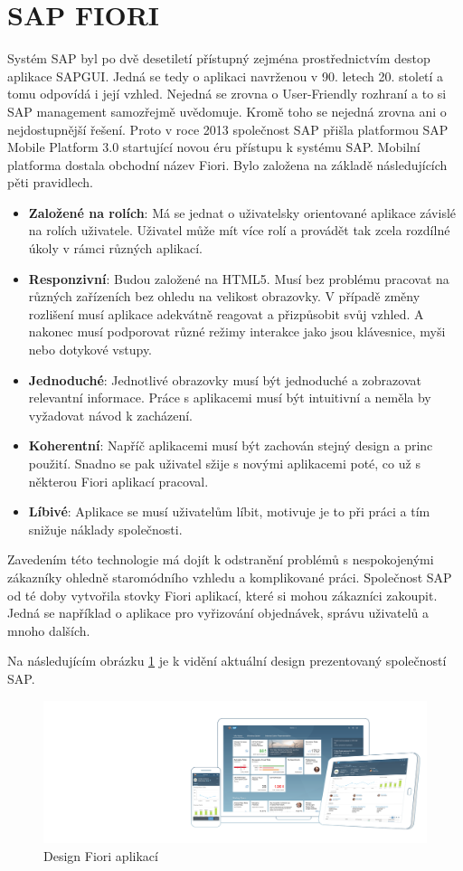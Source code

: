 \documentclass[thesis=M,czech]{FITthesis}[2012/06/26]
\begin{document}
\section{SAP FIORI}
\label{sec:fiori}
Systém SAP byl po dvě desetiletí přístupný zejména prostřednictvím destop aplikace SAPGUI. Jedná se tedy o aplikaci navrženou v 90. letech 20. století a tomu odpovídá i její vzhled. Nejedná se zrovna o User-Friendly rozhraní a to si SAP management samozřejmě uvědomuje. Kromě toho se nejedná zrovna ani o nejdostupnější řešení. Proto v roce 2013 společnost SAP přišla platformou SAP Mobile Platform 3.0 startující novou éru přístupu k systému SAP. Mobilní platforma dostala obchodní název Fiori. Bylo založena na základě následujících pěti pravidlech.
\begin{itemize}
	\item
	\textbf{Založené na rolích}: Má se jednat o uživatelsky orientované aplikace závislé na rolích uživatele. Uživatel může mít více rolí a provádět tak zcela rozdílné úkoly v rámci různých aplikací.  
	\item
	\textbf{Responzivní}: Budou založené na HTML5. Musí bez problému pracovat na různých zařízeních bez ohledu na velikost obrazovky. V případě změny rozlišení musí aplikace adekvátně reagovat a přizpůsobit svůj vzhled. A nakonec musí podporovat různé režimy interakce jako jsou klávesnice, myši nebo dotykové vstupy.
	\item
	\textbf{Jednoduché}: Jednotlivé obrazovky musí být jednoduché a zobrazovat relevantní informace. Práce s aplikacemi musí být intuitivní a neměla by vyžadovat návod k zacházení.
	\item
	\textbf{Koherentní}: Napříč aplikacemi musí být zachován stejný design a princ použití. Snadno se pak uživatel sžije s novými aplikacemi poté, co už s některou Fiori aplikací pracoval.
	\item
	\textbf{Líbivé}: Aplikace se musí uživatelům líbit, motivuje je to při práci a tím snižuje náklady společnosti.
\end{itemize} 	
Zavedením této technologie má dojít k odstranění problémů s nespokojenými zákazníky ohledně staromódního vzhledu a komplikované práci. Společnost SAP od té doby vytvořila stovky Fiori aplikací, které si mohou zákazníci zakoupit. Jedná se například o aplikace pro vyřizování objednávek, správu uživatelů a mnoho dalších. 

Na následujícím obrázku \ref{img:fiori_design} je k vidění aktuální design prezentovaný společností SAP.
\begin{figure}[H]
	\centering
	\includegraphics[width=1\textwidth]{images/fiori}
	\caption{Design Fiori aplikací}
	\label{img:fiori_design}
\end{figure}
\end{document}
